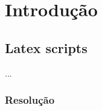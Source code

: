 \section{Introdução}

\subsection{Latex scripts}

\begin{frame}
   \begin{block}{}
      ...
   \end{block}
\end{frame}

\begin{frame}
  \frametitle{Resolução}
  \inputminted[linenos,fontsize=\scriptsize]{c}{codes/01-valor-absoluto.c}
\end{frame}

